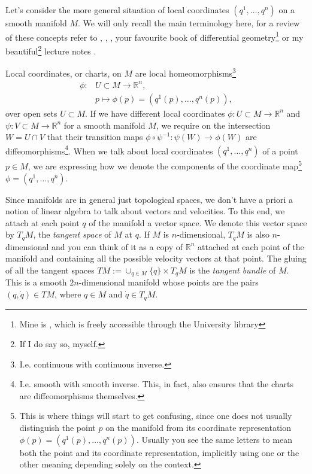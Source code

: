 \documentclass[english,fontsize=11pt,paper=b5]{scrbook}
\numberwithin{equation}{chapter}
\theoremstyle{definition}
\begin{document}
    Let's consider the more general situation of local coordinates $(q^1, \ldots, q^n)$ on a smooth manifold $M$.
    We will only recall the main terminology here, for a review of these concepts refer to \cite[Chapter 4.18]{book:arnold}, \cite[Appendix A]{book:knauf}, \cite[Chapter 4]{book:marsdenratiu}, your favourite book of differential geometry\footnote{Mine is \cite{book:lee}, which is freely accessible through the University library} or my beautiful\footnote{If I do say so, myself.} lecture notes \cite{lectures:aom:seri}.

    Local coordinates, or charts, on $M$ are local homeomorphisms\footnote{I.e. continuous with continuous inverse.}
    \begin{align}
      \phi: & U\subset M\to \mathbb{R}^n, \\
            & p \mapsto \phi(p) = (q^1(p), \ldots, q^n(p)),
    \end{align}
    over open sets $U\subset M$. If we have different local coordinates $\phi:U\subset M\to\mathbb{R}^n$ and $\psi:V\subset M\to\mathbb{R}^n$ for a smooth manifold $M$, we require on the intersection $W=U\cap V$ that their transition maps $\phi\circ\psi^{-1}:\psi(W)\to\phi(W)$ are diffeomorphisms\footnote{I.e. smooth with smooth inverse. This, in fact, also ensures that the charts are diffeomorphisms themselves.}.
    When we talk about local coordinates $(q^1,\ldots,q^n)$ of a point $p\in M$, we are expressing how we denote the components of the coordinate map\footnote{This is where things will start to get confusing, since one does not usually distinguish the point $p$ on the manifold from its coordinate representation $\phi(p)=(q^1(p), \ldots, q^n(p))$. Usually you see the same letters to mean both the point and its coordinate representation, implicitly using one or the other meaning depending solely on the context.} $\phi=(q^1, \ldots, q^n)$.

    Since manifolds are in general just topological spaces, we don't have a priori a notion of linear algebra to talk about vectors and velocities.
    To this end, we attach at each point $q$ of the manifold a vector space.
    We denote this vector space by $T_q M$, the \emph{tangent space} of $M$ at $q$.
    If $M$ is $n$-dimensional, $T_q M$ is also $n$-dimensional and you can think of it as a copy of $\mathbb{R}^n$ attached at each point of the manifold and containing all the possible velocity vectors at that point.
    The gluing of all the tangent spaces $TM := \cup_{q\in M}\{q\}\times T_q M$ is the \emph{tangent bundle} of $M$. This is a smooth $2n$-dimensional manifold whose points are the pairs $(q,\dot q)\in TM$, where $q\in M$ and $\dot q\in T_q M$.
\end{document}
